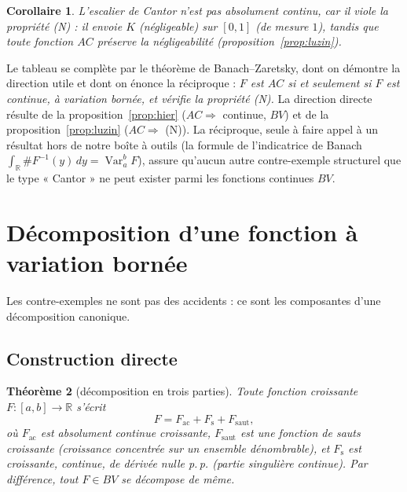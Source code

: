 \documentclass[11pt]{article}
\theoremstyle{thmblue}
\newtheorem{theoreme}{Théorème}[section]
\newtheorem{corollaire}[theoreme]{Corollaire}
\theoremstyle{defplain}
\theoremstyle{rem}
\newcommand{\R}{\mathbb{R}}
\newcommand{\Var}{\operatorname{Var}}
\newcommand{\pp}{p.\,p.}
\begin{document}
\begin{corollaire}\label{cor:cantor-N}
L'escalier de Cantor n'est pas absolument continu, car il viole la propriété (N) : il envoie $K$
(négligeable) sur $[0,1]$ (de mesure $1$), tandis que toute fonction $AC$ préserve la négligeabilité
(proposition~\ref{prop:luzin}).
\end{corollaire}

Le tableau se complète par le théorème de Banach--Zaretsky, dont on démontre la direction utile et
dont on énonce la réciproque : \emph{$F$ est $AC$ si et seulement si $F$ est continue, à variation
bornée, et vérifie la propriété (N).} La direction directe résulte de la proposition~\ref{prop:hier}
($AC\Rightarrow$ continue, $BV$) et de la proposition~\ref{prop:luzin} ($AC\Rightarrow$ (N)). La
réciproque, seule à faire appel à un résultat hors de notre boîte à outils (la formule de l'indicatrice
de Banach $\int_\R \#F^{-1}(y)\,dy=\Var_a^b F$), assure qu'aucun autre contre-exemple structurel que
le type « Cantor » ne peut exister parmi les fonctions continues $BV$.

\section{Décomposition d'une fonction à variation bornée}

Les contre-exemples ne sont pas des accidents : ce sont les composantes d'une décomposition canonique.

\subsection{Construction directe}

\begin{theoreme}[décomposition en trois parties]\label{thm:decomp}
Toute fonction croissante $F:[a,b]\to\R$ s'écrit
\[
F=F_{\mathrm{ac}}+F_{\mathrm{s}}+F_{\mathrm{saut}},
\]
où $F_{\mathrm{ac}}$ est absolument continue croissante, $F_{\mathrm{saut}}$ est une fonction de sauts
croissante (croissance concentrée sur un ensemble dénombrable), et $F_{\mathrm{s}}$ est croissante,
\emph{continue}, de dérivée nulle \pp{} (partie \emph{singulière continue}). Par différence, tout
$F\in BV$ se décompose de même.
\end{theoreme}
\end{document}
